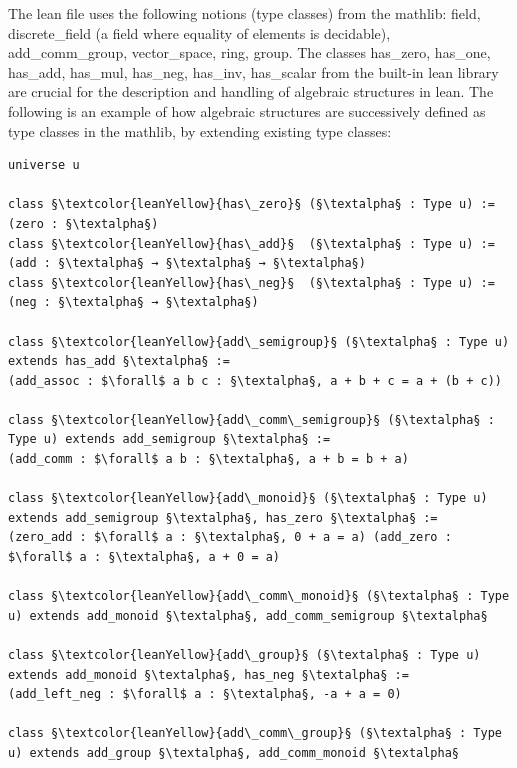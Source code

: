 \documentclass[11pt]{article}
\begin{document}
The lean file uses the following notions (type classes) from the mathlib: {\lean field}, {\lean discrete\_field} (a field where equality of elements is decidable), {\lean add\_comm\_group}, {\lean vector\_space}, {\lean ring}, {\lean group}.
The classes {\lean has\_zero}, {\lean has\_one}, {\lean has\_add}, {\lean has\_mul}, {\lean has\_neg}, {\lean has\_inv}, {\lean has\_scalar} from the built-in lean library are crucial for the description and handling of algebraic structures in lean.
The following is an example of how algebraic structures are successively defined as type classes in the mathlib, by extending existing type classes:
\begin{lstlisting}
universe u

class §\textcolor{leanYellow}{has\_zero}§ (§\textalpha§ : Type u) := (zero : §\textalpha§)
class §\textcolor{leanYellow}{has\_add}§  (§\textalpha§ : Type u) := (add : §\textalpha§ → §\textalpha§ → §\textalpha§)
class §\textcolor{leanYellow}{has\_neg}§  (§\textalpha§ : Type u) := (neg : §\textalpha§ → §\textalpha§)

class §\textcolor{leanYellow}{add\_semigroup}§ (§\textalpha§ : Type u) extends has_add §\textalpha§ :=
(add_assoc : $\forall$ a b c : §\textalpha§, a + b + c = a + (b + c))

class §\textcolor{leanYellow}{add\_comm\_semigroup}§ (§\textalpha§ : Type u) extends add_semigroup §\textalpha§ :=
(add_comm : $\forall$ a b : §\textalpha§, a + b = b + a)

class §\textcolor{leanYellow}{add\_monoid}§ (§\textalpha§ : Type u) extends add_semigroup §\textalpha§, has_zero §\textalpha§ :=
(zero_add : $\forall$ a : §\textalpha§, 0 + a = a) (add_zero : $\forall$ a : §\textalpha§, a + 0 = a)

class §\textcolor{leanYellow}{add\_comm\_monoid}§ (§\textalpha§ : Type u) extends add_monoid §\textalpha§, add_comm_semigroup §\textalpha§

class §\textcolor{leanYellow}{add\_group}§ (§\textalpha§ : Type u) extends add_monoid §\textalpha§, has_neg §\textalpha§ :=
(add_left_neg : $\forall$ a : §\textalpha§, -a + a = 0)

class §\textcolor{leanYellow}{add\_comm\_group}§ (§\textalpha§ : Type u) extends add_group §\textalpha§, add_comm_monoid §\textalpha§
\end{lstlisting}
\end{document}

